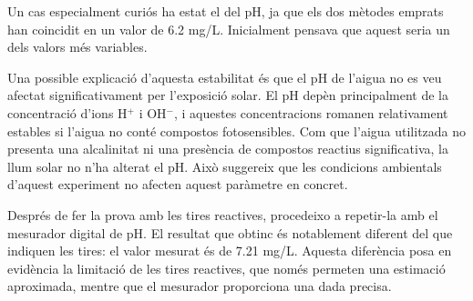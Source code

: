 Un cas especialment curiós ha estat el del pH, ja que els dos mètodes emprats han coincidit en un valor de 6.2 mg/L. Inicialment pensava que aquest seria un dels valors més variables.

Una possible explicació d’aquesta estabilitat és que el pH de l’aigua no es veu afectat significativament per l’exposició solar. El pH depèn principalment de la concentració d’ions H$^+$ i OH$^-$, i aquestes concentracions romanen relativament estables si l’aigua no conté compostos fotosensibles. Com que l’aigua utilitzada no presenta una alcalinitat ni una presència de compostos reactius significativa, la llum solar no n’ha alterat el pH. Això suggereix que les condicions ambientals d’aquest experiment no afecten aquest paràmetre en concret.

Després de fer la prova amb les tires reactives, procedeixo a repetir-la amb el mesurador digital de pH. El resultat que obtinc és notablement diferent del que indiquen les tires: el valor mesurat és de 7.21 mg/L. Aquesta diferència posa en evidència la limitació de les tires reactives, que només permeten una estimació aproximada, mentre que el mesurador proporciona una dada precisa.

